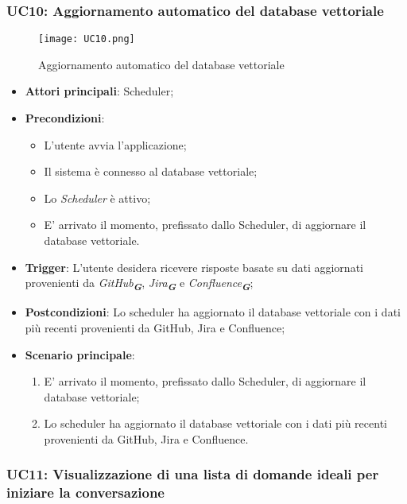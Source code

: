 \newpage

\hypertarget{UC10}{}
\subsubsection{UC10: Aggiornamento automatico del database vettoriale}

\begin{figure}[h]
    \centering
    \texttt{[image: UC10.png]}
    \caption{Aggiornamento automatico del database vettoriale}
\end{figure}

\begin{itemize}
    \item \textbf{Attori principali}: Scheduler;
    \item \textbf{Precondizioni}: 
    \begin{itemize}
        \item L'utente avvia l'applicazione;
        \item Il sistema è connesso al database vettoriale;
        \item Lo \emph{Scheduler} è attivo;
        \item E' arrivato il momento, prefissato dallo Scheduler, di aggiornare il database vettoriale.
    \end{itemize}
    \item \textbf{Trigger}: L'utente desidera ricevere risposte basate su dati aggiornati provenienti da \emph{GitHub}\textsubscript{\textbf{\textit{G}}}, 
    \emph{Jira}\textsubscript{\textbf{\textit{G}}} e \emph{Confluence}\textsubscript{\textbf{\textit{G}}};
    \item \textbf{Postcondizioni}: Lo scheduler ha aggiornato il database vettoriale con i dati più recenti provenienti da GitHub, Jira e Confluence;
    \item \textbf{Scenario principale}:
    \begin{enumerate}
        \item E' arrivato il momento, prefissato dallo Scheduler, di aggiornare il database vettoriale;
        \item Lo scheduler ha aggiornato il database vettoriale con i dati più recenti provenienti da GitHub, Jira e Confluence.
    \end{enumerate}
\end{itemize}

\newpage

\hypertarget{UC11}{}
\subsubsection{UC11: Visualizzazione di una lista di domande ideali per iniziare la conversazione}

